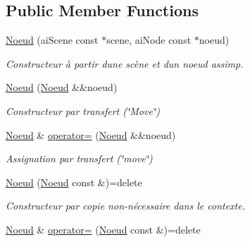 \subsection*{Public Member Functions}
\begin{DoxyCompactItemize}
\item 
\hyperlink{classmodele_1_1_noeud_af36dc9d97d88a25fb09379831a5ac117}{Noeud} (ai\+Scene const $\ast$scene, ai\+Node const $\ast$noeud)
\begin{DoxyCompactList}\small\item\em Constructeur à partir d\textquotesingle{}une scène et d\textquotesingle{}un noeud assimp. \end{DoxyCompactList}\item 
\hyperlink{classmodele_1_1_noeud_a41af554e17164a82f8fde7b5a06c245d}{Noeud} (\hyperlink{classmodele_1_1_noeud}{Noeud} \&\&noeud)
\begin{DoxyCompactList}\small\item\em Constructeur par transfert (\char`\"{}\+Move\char`\"{}) \end{DoxyCompactList}\item 
\hyperlink{classmodele_1_1_noeud}{Noeud} \& \hyperlink{classmodele_1_1_noeud_ae802c4f1ecdeae27a440f2705700834e}{operator=} (\hyperlink{classmodele_1_1_noeud}{Noeud} \&\&noeud)
\begin{DoxyCompactList}\small\item\em Assignation par transfert (\char`\"{}move\char`\"{}) \end{DoxyCompactList}\item 
\hypertarget{classmodele_1_1_noeud_a0b746cc9e13a4837b2f856691837397f}{}\hyperlink{classmodele_1_1_noeud_a0b746cc9e13a4837b2f856691837397f}{Noeud} (\hyperlink{classmodele_1_1_noeud}{Noeud} const \&)=delete\label{classmodele_1_1_noeud_a0b746cc9e13a4837b2f856691837397f}

\begin{DoxyCompactList}\small\item\em Constructeur par copie non-\/nécessaire dans le contexte. \end{DoxyCompactList}\item 
\hypertarget{classmodele_1_1_noeud_a7a44b7e1452a09b88f63ef76b22ddec4}{}\hyperlink{classmodele_1_1_noeud}{Noeud} \& \hyperlink{classmodele_1_1_noeud_a7a44b7e1452a09b88f63ef76b22ddec4}{operator=} (\hyperlink{classmodele_1_1_noeud}{Noeud} const \&)=delete\label{classmodele_1_1_noeud_a7a44b7e1452a09b88f63ef76b22ddec4}


\end{DoxyCompactItemize}
